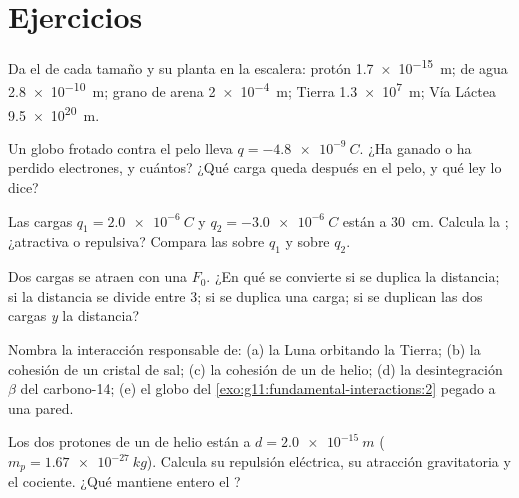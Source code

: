 \section{Ejercicios}

\begin{exercise}[$\star$]\label{exo:g11:fundamental-interactions:1}
Da el  de cada tamaño y su planta en la escalera:
protón \qty{1.7e-15}{m};  de agua \qty{2.8e-10}{m}; grano de
arena \qty{2e-4}{m}; Tierra \qty{1.3e7}{m}; Vía Láctea
\qty{9.5e20}{m}.
\end{exercise}

\begin{exercise}[$\star$]\label{exo:g11:fundamental-interactions:2}
Un globo frotado contra el pelo lleva $q = \qty{-4.8e-9}{C}$. ¿Ha ganado
o ha perdido electrones, y cuántos? ¿Qué carga queda después en el pelo,
y qué ley lo dice?
\end{exercise}

\begin{exercise}[$\star$]\label{exo:g11:fundamental-interactions:3}
Las cargas $q_1 = \qty{+2.0e-6}{C}$ y $q_2 = \qty{-3.0e-6}{C}$ están a
\qty{30}{cm}. Calcula la ; ¿atractiva o repulsiva? Compara las
 sobre $q_1$ y sobre $q_2$.
\end{exercise}

\begin{exercise}[$\star$]\label{exo:g11:fundamental-interactions:4}
Dos cargas se atraen con una  $F_0$. ¿En qué se convierte si se
duplica la distancia; si la distancia se divide entre $3$; si se duplica
una carga; si se duplican las dos cargas \emph{y} la distancia?
\end{exercise}

\begin{exercise}[$\star$]\label{exo:g11:fundamental-interactions:5}
Nombra la interacción responsable de: (a) la Luna orbitando la Tierra;
(b) la cohesión de un cristal de sal; (c) la cohesión de un  de
helio; (d) la desintegración $\beta$ del carbono-14; (e) el globo del
\cref{exo:g11:fundamental-interactions:2} pegado a una pared.
\end{exercise}

\begin{exercise}[$\star\star$]\label{exo:g11:fundamental-interactions:6}
Los dos protones de un  de helio están a $d = \qty{2.0e-15}{m}$
($m_p = \qty{1.67e-27}{kg}$). Calcula su repulsión eléctrica, su
atracción gravitatoria y el cociente. ¿Qué mantiene entero el ?
\end{exercise}

